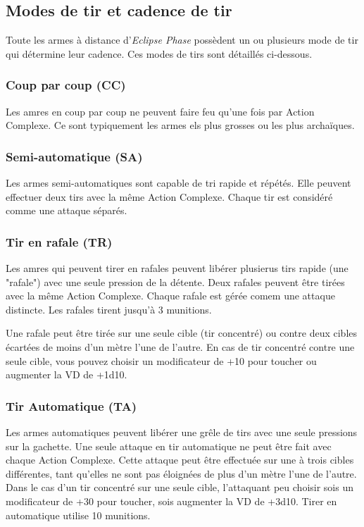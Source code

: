 \subsection{Modes de tir et cadence de tir} \label{sec:firing-modes-rate} 

Toute les armes à distance d'\emph{Eclipse Phase} possèdent un ou plusieurs mode de tir qui détermine leur cadence. Ces modes de tirs sont détaillés ci-dessous. 

\subsubsection{Coup par coup (CC)} 

Les amres en coup par coup ne peuvent faire feu qu'une fois par Action Complexe. Ce sont typiquement les armes els plus grosses ou les plus archaïques. 

\subsubsection{Semi-automatique (SA)} 

Les armes semi-automatiques sont capable de tri rapide et répétés. Elle peuvent effectuer deux tirs avec la même Action Complexe. Chaque tir est considéré comme une attaque séparés. 

\subsubsection{Tir en rafale (TR)} 

Les amres qui peuvent tirer en rafales peuvent libérer plusierus tirs rapide (une "rafale") avec une seule pression de la détente. Deux rafales peuvent être tirées avec la même Action Complexe. Chaque rafale est gérée comem une attaque distincte. Les rafales tirent jusqu'à 3 munitions. 

Une rafale peut être tirée sur une seule cible (tir concentré) ou contre deux cibles écartées de moins d'un mètre l'une de l'autre. En cas de tir concentré contre une seule cible, vous pouvez choisir un modificateur de +10 pour toucher ou augmenter la VD de +1d10. 

\subsubsection{Tir Automatique (TA)} 

Les armes automatiques peuvent libérer une grêle de tirs avec une seule pressions sur la gachette. Une seule attaque en tir automatique ne peut être fait avec chaque Action Complexe.
Cette attaque peut être effectuée sur une à trois cibles différentes, tant qu'elles ne sont pas éloignées de plus d'un mètre l'une de l'autre.
Dans le cas d'un tir concentré sur une seule cible, l'attaquant peu choisir sois un modificateur de +30 pour toucher, sois augmenter la VD de +3d10. Tirer en automatique utilise 10 munitions. 

